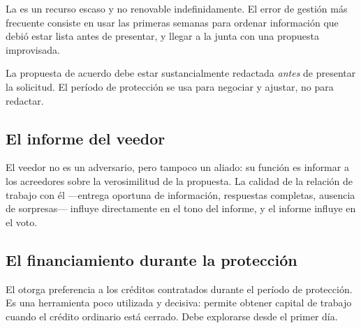 La \pfc{} es un recurso escaso y no renovable indefinidamente. El error de gestión más
frecuente consiste en usar las primeras semanas para ordenar información que debió estar
lista antes de presentar, y llegar a la junta con una propuesta improvisada.

\begin{foco}
La propuesta de acuerdo debe estar sustancialmente redactada \emph{antes} de presentar la
solicitud. El período de protección se usa para negociar y ajustar, no para redactar.
\end{foco}

\subsection{El informe del veedor}

El veedor no es un adversario, pero tampoco un aliado: su función es informar a los
acreedores sobre la verosimilitud de la propuesta. La calidad de la relación de trabajo
con él ---entrega oportuna de información, respuestas completas, ausencia de sorpresas---
influye directamente en el tono del informe, y el informe influye en el voto.

\subsection{El financiamiento durante la protección}

El  otorga preferencia a los créditos contratados durante el período de
protección. Es una herramienta poco utilizada y decisiva: permite obtener capital de
trabajo cuando el crédito ordinario está cerrado. Debe explorarse desde el primer día.

\bloqueCronograma

